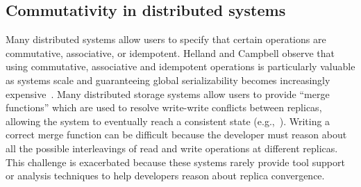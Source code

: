 \subsection{Commutativity in distributed systems}
Many distributed systems allow users to specify that certain operations are
commutative, associative, or idempotent. Helland and Campbell observe that using
commutative, associative and idempotent operations is particularly valuable as
systems scale and guaranteeing global serializability becomes increasingly
expensive~\cite{Helland2009}. Many distributed storage systems allow users to
provide ``merge functions'' which are used to resolve write-write conflicts
between replicas, allowing the system to eventually reach a consistent state
(e.g.,~\cite{DeCandia2007,Lloyd2011,Power2010,Terry1995}).%
Writing a correct merge function can be difficult because the developer must
reason about all the possible interleavings of read and write operations at
different replicas. This challenge is exacerbated because these systems rarely
provide tool support or analysis techniques to help developers reason about
replica convergence.



